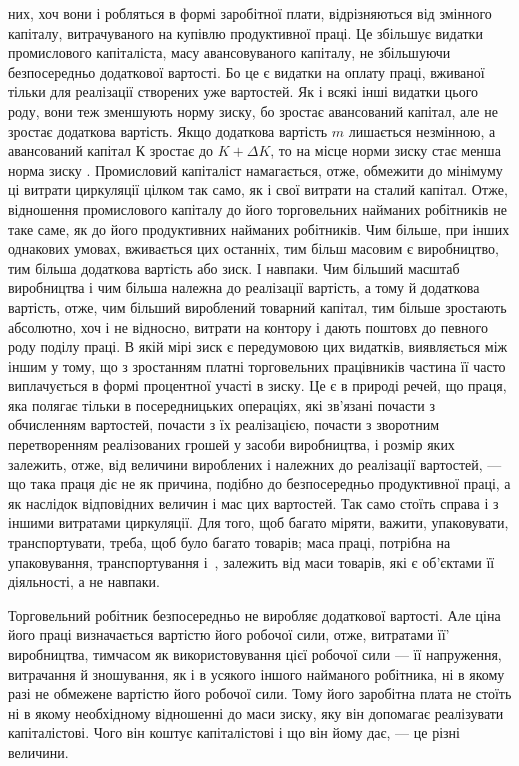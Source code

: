 \parcont{}  %
них, хоч вони і робляться в формі заробітної плати, відрізняються
від змінного капіталу, витрачуваного на купівлю продуктивної
праці. Це збільшує видатки промислового капіталіста, масу
авансовуваного капіталу, не збільшуючи безпосередньо додаткової
вартості. Бо це є видатки на оплату праці, вживаної тільки
для реалізації створених уже вартостей. Як і всякі інші видатки
цього роду, вони теж зменшують норму зиску, бо зростає авансований
капітал, але не зростає додаткова вартість. Якщо додаткова
вартість $m$ лишається незмінною, а авансований капітал $К$
зростає до $K + ΔK$, то на місце норми зиску  стає менша норма
зиску . Промисловий капіталіст намагається, отже, обмежити
до мінімуму ці витрати циркуляції цілком так само, як і
свої витрати на сталий капітал. Отже, відношення промислового
капіталу до його торговельних найманих робітників не таке саме,
як до його продуктивних найманих робітників. Чим більше, при
інших однакових умовах, вживається цих останніх, тим більш
масовим є виробництво, тим більша додаткова вартість або зиск.
І навпаки. Чим більший масштаб виробництва і чим більша належна
до реалізації вартість, а тому й додаткова вартість, отже,
чим більший вироблений товарний капітал, тим більше зростають
абсолютно, хоч і не відносно, витрати на контору і дають поштовх
до певного роду поділу праці. В якій мірі зиск є передумовою
цих видатків, виявляється між іншим у тому, що з зростанням
платні торговельних працівників частина її часто виплачується
в формі процентної участі в зиску. Це є в природі
речей, що праця, яка полягає тільки в посередницьких операціях,
які зв’язані почасти з обчисленням вартостей, почасти з їх реалізацією,
почасти з зворотним перетворенням реалізованих грошей
у засоби виробництва, і розмір яких залежить, отже, від
величини вироблених і належних до реалізації вартостей, — що
така праця діє не як причина, подібно до безпосередньо продуктивної
праці, а як наслідок відповідних величин і мас цих вартостей.
Так само стоїть справа і з іншими витратами циркуляції.
Для того, щоб багато міряти, важити, упаковувати, транспортувати,
треба, щоб було багато товарів; маса праці, потрібна на
упаковування, транспортування і~, залежить від маси товарів,
які є об’єктами її діяльності, а не навпаки.

Торговельний робітник безпосередньо не виробляє додаткової
вартості. Але ціна його праці визначається вартістю його
робочої сили, отже, витратами її' виробництва, тимчасом як
використовування цієї робочої сили — її напруження, витрачання
й зношування, як і в усякого іншого найманого робітника, ні в
якому разі не обмежене вартістю його робочої сили. Тому його
заробітна плата не стоїть ні в якому необхідному відношенні
до маси зиску, яку він допомагає реалізувати капіталістові. Чого
він коштує капіталістові і що він йому дає, — це різні величини.
\parbreak{}  %

